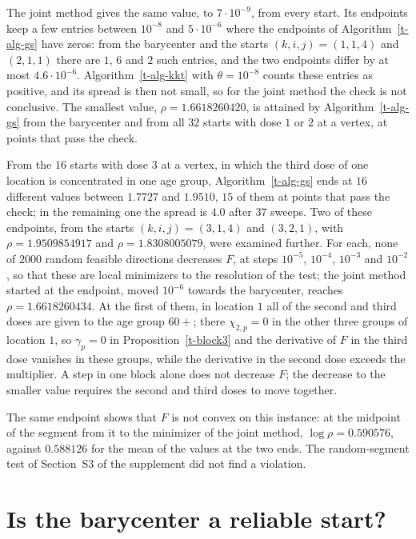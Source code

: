 \documentclass[11pt]{article}
\theoremstyle{plain}
\theoremstyle{remark}
\numberwithin{equation}{section}
\begin{document}
The joint method gives the same value, to $7\cdot 10^{-9}$, from every start.
Its endpoints keep a few entries between $10^{-8}$ and $5\cdot 10^{-6}$ where
the endpoints of Algorithm~\ref{t-alg-gs} have zeros: from the barycenter and
the starts $(k,i,j)=(1,1,4)$ and $(2,1,1)$ there are $1$, $6$ and $2$ such
entries, and the two endpoints differ by at most $4.6\cdot 10^{-6}$.
Algorithm~\ref{t-alg-kkt} with $\theta=10^{-8}$ counts these entries as
positive, and its spread is then not small, so for the joint method the check
is not conclusive. The smallest value,
$\rho=1.6618260420$, is attained by Algorithm~\ref{t-alg-gs} from the
barycenter and from all $32$ starts with dose $1$ or $2$ at a vertex, at points
that pass the check.

From the $16$ starts with dose $3$ at a vertex, in which the third dose of one location is
concentrated in one age group, Algorithm~\ref{t-alg-gs} ends at $16$ different
values between $1.7727$ and $1.9510$, $15$ of them at points that pass the
check; in the remaining one the spread is $4.0$ after $37$ sweeps. Two of
these endpoints, from the starts $(k,i,j)=(3,1,4)$ and $(3,2,1)$, with
$\rho=1.9509854917$ and $\rho=1.8308005079$, were examined further. For each,
none of $2000$ random feasible directions decreases $F$, at steps $10^{-5}$,
$10^{-4}$, $10^{-3}$ and $10^{-2}$, so that these are local minimizers to the
resolution of the test; the joint method started at the endpoint, moved
$10^{-6}$ towards the barycenter, reaches $\rho=1.6618260434$. At the first of
them, in location $1$ all of the second and third doses are given to the age
group $60+$; there $\chi_{2,p}=0$ in the other three groups of location $1$, so
$\gamma_p=0$ in Proposition~\ref{t-block3} and the derivative of $F$ in the
third dose vanishes in these groups, while the derivative in the second dose
exceeds the multiplier. A step in one block alone does not decrease $F$; the
decrease to the smaller value requires the second and third doses to move
together.

The same endpoint shows that $F$ is not convex on this instance: at the
midpoint of the segment from it to the minimizer of the joint method,
$\log\rho=0.590576$, against $0.588126$ for the mean of the values at the two
ends. The random-segment test of Section~S3 of the supplement did not find a
violation.

\section{Is the barycenter a reliable start?}\label{t-instances}
\end{document}

